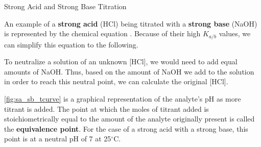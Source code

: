 \documentclass[10pt]{article}
\begin{document}
    \begin{core}{Strong Acid and Strong Base Titration}

      An example of a \textbf{strong acid} (HCl) being titrated with a \textbf{strong base} (NaOH) is represented by the chemical equation . Because of their high $K_{a/b}$ values, we can simplify this equation to the following.


      To neutralize a solution of an unknown [HCl], we would need to add equal amounts of NaOH. Thus, based on the amount of NaOH we add to the solution in order to reach this neutral point, we can calculate the original [HCl].


      \autoref{fig:sa_sb_tcurve} is a graphical representation of the analyte's pH as more titrant is added. The point at which the moles of titrant added is stoichiometrically equal to the amount of the analyte originally present is called the \textbf{equivalence point}. For the case of a strong acid with a strong base, this point is at a neutral pH of 7 at 25$^\circ$C.

    \end{core}
\end{document}
